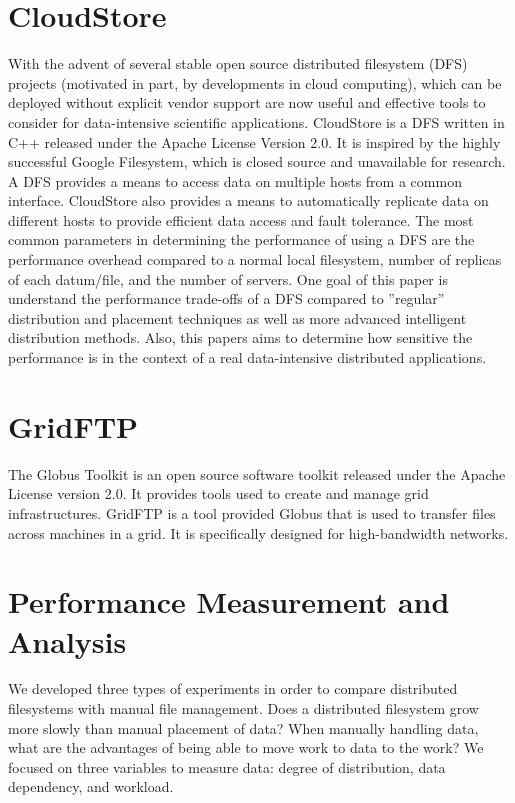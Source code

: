 \documentclass{rspublic}
\begin{document}
\section{CloudStore} With the advent of several stable open source
distributed filesystem (DFS) projects (motivated in part, by
developments in cloud computing), which can be deployed without explicit
vendor support are now useful and effective tools to consider for
data-intensive scientific applications.  CloudStore is a DFS written in
C++ released under the Apache License Version 2.0.  It is inspired by
the highly successful Google Filesystem, which is closed source and
unavailable for research.  A DFS provides a means to access data on
multiple hosts from a common interface.  CloudStore also provides a
means to automatically replicate data on different hosts to provide
efficient data access and fault tolerance.  The most common parameters
in determining the performance of using a DFS are the performance
overhead compared to a normal local filesystem, number of replicas of
each datum/file, and the number of servers.  One goal of this paper is
understand the performance trade-offs of a DFS compared to ''regular''
distribution and placement techniques as well as more advanced
intelligent distribution methods.  Also, this papers aims to determine
how sensitive the performance is in the context of a real data-intensive
distributed applications.

\section{GridFTP} The Globus Toolkit is an open source software toolkit
released under the Apache License version 2.0.  It provides tools used
to create and manage grid infrastructures.  GridFTP is a tool provided
Globus that is used to transfer files across machines in a grid.  It is
specifically designed for high-bandwidth networks.

\section{Performance Measurement and Analysis} We developed three types
of experiments in order to compare distributed filesystems with manual
file management.  Does a distributed filesystem grow more slowly than
manual placement of data?  When manually handling data, what are the
advantages of being able to move work to data to the work?  We focused
on three variables to measure data:  degree of distribution, data
dependency, and workload.
\end{document}

